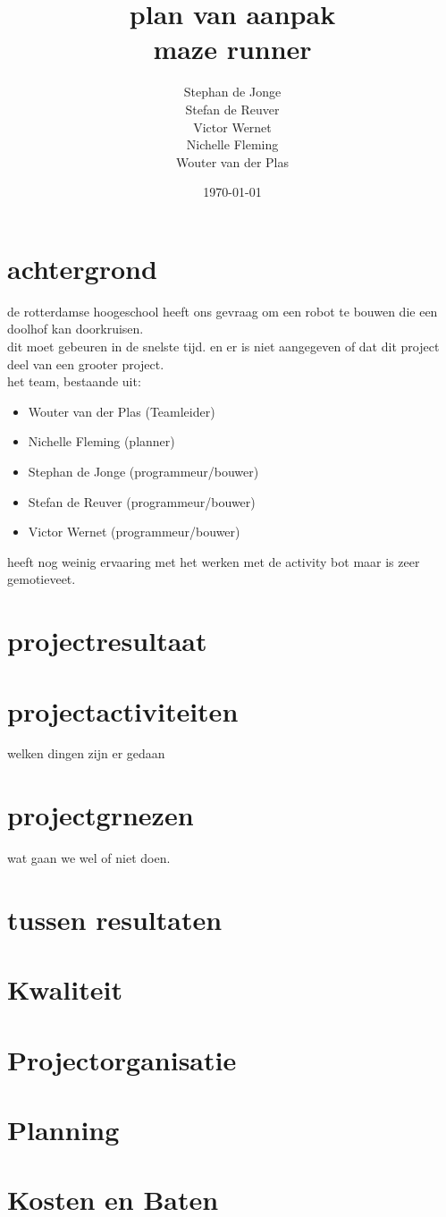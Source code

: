 \documentclass[oneside]{book}
\title{plan van aanpak\\maze runner}
\author{
	Stephan de Jonge\\
	Stefan de Reuver\\
	Victor Wernet\\
	Nichelle Fleming\\
	Wouter van der Plas
}
\date{\today}
\begin{document}
\maketitle
\tableofcontents
{}


\chapter{achtergrond}
de rotterdamse hoogeschool heeft ons gevraag om een robot te bouwen die een doolhof kan doorkruisen.\\
dit moet gebeuren in de snelste tijd. en er is niet aangegeven of dat dit project deel van een grooter project.\\
het team, bestaande uit:\\
\begin{itemize}
	\item Wouter van der Plas (Teamleider)
	\item Nichelle Fleming (planner)
	\item Stephan de Jonge (programmeur/bouwer)
	\item Stefan de Reuver (programmeur/bouwer)
	\item Victor Wernet (programmeur/bouwer)
\end{itemize}	
heeft nog weinig ervaaring met het werken met de activity bot maar is zeer gemotieveet.\\


\clearpage
\chapter{projectresultaat}
\clearpage
\chapter{projectactiviteiten}
welken dingen zijn er gedaan
\clearpage
\chapter{projectgrnezen}
wat gaan we wel of niet doen.
\clearpage
\chapter{tussen resultaten}
\clearpage
\chapter{Kwaliteit}
\clearpage
\chapter{Projectorganisatie}
\clearpage
\chapter{Planning}
\clearpage
\chapter{Kosten en Baten}
\clearpage
\end{document}
